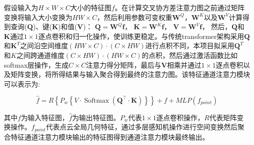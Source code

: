 \documentclass[12pt]{article}
\begin{document}
假设输入为$H \times W \times C$大小的特征图$f$。在计算交叉协方差注意力图之前通过矩阵变换将输入大小变换为$H W \times C$，然后利用参数可变权重$\boldsymbol{W}^{Q}$，$\boldsymbol{W}^{K}$以及$\boldsymbol{W}^{V}$计算得到查询($\boldsymbol{Q}$)、键($\boldsymbol{K}$)和值($\boldsymbol{V}$)：
$\boldsymbol{Q}=\boldsymbol{W}^{Q} \boldsymbol{f}$，
$\boldsymbol{K}=\boldsymbol{W}^{K} \boldsymbol{f}$，
$\boldsymbol{V}=\boldsymbol{W}^{V} \boldsymbol{f}$，
然后，$\boldsymbol{Q}$和$\boldsymbol{K}$通过$1 \times 1$逐点卷积和归一化操作，使训练更稳定。与传统transformer架构采用$\boldsymbol{Q}$和$\boldsymbol{K}^{T}$之间沿空间维度$(H W \times C) \cdot(C \times H W)$进行点积不同，本项目拟采用$\boldsymbol{Q}^{T}$和$K$之间跨通道维度$(C \times H W) \cdot(H W \times C)$的点积，然后通过激活函数比如softmax层操作，生成$C \times C$注意力得分矩阵，最后与$\boldsymbol{V}$相乘并通过$1 \times 1$逐点卷积以及矩阵变换，将所得结果与输入聚合得到最终的注意力图。该特征通道注意力模块可以表示为:

\begin{equation}
    \hat{f}=R\left\{P_{w}\left\{V \cdot \operatorname{Softmax }\left(\boldsymbol{Q}^{\top} \cdot \boldsymbol{K}\right)\right\}\right\}+f+MLP\left(f_{point}\right)
\end{equation}

其中$f$为输入特征图，$\hat{f}$为输出特征图。$P_{w}$代表$1 \times 1$逐点卷积操作，$R$代表矩阵变换操作。$f_{point}$代表点云全局几何特征，通过多层感知机操作进行空间变换然后聚合特征通道注意力模块输出的特征图得到通道注意力模块最终输出。 


\end{document}
